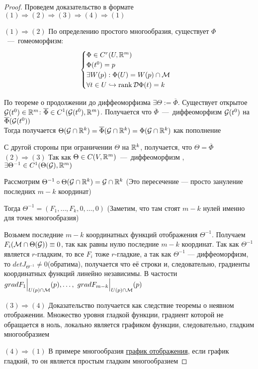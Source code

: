 \begin{proof}
    Проведем доказательство в формате $(1) \Longrightarrow (2) \Longrightarrow (3) \Longrightarrow (4) \Longrightarrow (1)$

    $(1) \Longrightarrow (2)$ По определению простого многообразия, существует $\Phi$~---~гомеоморфизм:
    \[
    \begin{cases}
        \Phi \in C^{r}(U, \mathbb{R}^m) \\
        \Phi(t^0) = p \\
        \exists W(p): \Phi(U)= W(p) \cap \mathcal{M} \\
        \forall t \in U \hookrightarrow \operatorname{rank}\mathcal{D} \Phi(t) = k \\
    \end{cases}
    \]
    
    По теореме о продолжении до диффеоморфизма $\exists \Theta := \overline{\Phi}$. Существует открытое $\mathcal{G}(t^0) \in \mathbb{R}^m$: $\overline{\Phi} \in C^{1}(\mathcal{G}(t^0), \mathbb{R}^m)$. Получается что $\overline{\Phi}$~---~диффеоморфизм $\mathcal{G}(t^0)$ на $\overline{\Phi} (\mathcal{G}(t^0))$ \\

    Тогда получается $\Theta(\mathcal{G} \cap \mathbb{R}^k) = \overline{\Phi}(\mathcal{G} \cap \mathbb{R}^k) = \Phi(\mathcal{G} \cap \mathbb{R}^k)$ как пополнение

    С другой стороны при ограничении $\Theta$ на $\mathbb{R}^k$, получается, что $ \Theta = \overline{\Phi}$    \\


    $(2) \Longrightarrow (3)$
    Так как $\Theta \in C(V, \mathbb{R}^m)$~---~диффеоморфизм , $\exists \Theta^{-1} \in C^{1}(\Theta(\mathcal{G}), \mathbb{R}^{m})$

    Рассмотрим $\Theta^{-1} \circ \Theta (\mathcal{G} \cap \mathbb{R}^k) = \mathcal{G} \cap \mathbb{R}^{k}$ (Это пересечение — просто зануление последних $m-k$ координат)

    Тогда $\Theta^{-1} = (F_1, \dots, F_{k}, 0, \dots, 0 )$ (Заметим, что там стоят $m-k$ нулей именно для точек многообразия)

    Возьмем последние $m-k$ координатных функций отображения $\Theta ^ {-1}$.
    Получаем $F_i (\mathcal{M} \cap \Theta(\mathcal{G})) \equiv 0$, так как равны нулю последние $m-k$ координат.
    Так как $\Theta^{-1}$ является $r$-гладким, то все $F_i$ тоже $r$-гладкие, а так как $\Theta^{-1}$ — диффеоморфизм, то $det J_{\Theta^{-1}} \neq 0$(обратима), получается что её строки и, следовательно, градиенты координатных функций линейно независимы. В частости $grad F_1\Bigr|_{U(p) \cap \mathcal{M}}(p),\dots, \ grad F_{m-k}\Bigr|_{U(p) \cap \mathcal{M}}(p)$

    $(3) \Longrightarrow (4)$
    Доказательство получается как следствие теоремы о неявном отображении. Множество уровня гладкой функции, градиент которой не обращается в ноль, локально является графиком функции, следовательно, гладким многообразием

    $(4) \Longrightarrow (1)$
    В примере многообразия \hyperlink{example3.2}{график отображения}, если график гладкий, то он является простым гладким многообразием
\end{proof}
